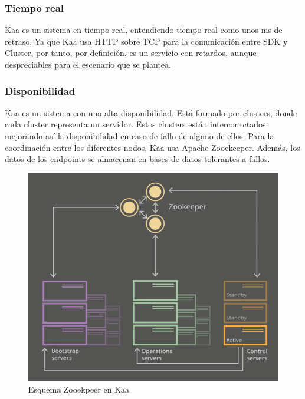 \documentclass[12pt, twoside]{book}
\begin{document}
\subsubsection*{Tiempo real}
Kaa es un sistema en tiempo real, entendiendo tiempo real como unos ms de retraso. Ya que Kaa usa HTTP sobre TCP para la comunicación entre SDK y Cluster, por tanto, por definición, es un servicio con retardos, aunque despreciables para el escenario que se plantea.


\subsubsection*{Disponibilidad}
Kaa es un sistema con una alta disponibilidad. Está formado por clusters, donde cada cluster representa un servidor. Estos clusters están interconectados mejorando así la disponibilidad en caso de fallo de alguno de ellos. Para la coordinación entre los diferentes nodos, Kaa usa Apache Zooekeeper. Además, los datos de los endpoints se almacenan en bases de datos tolerantes a fallos.
\begin{figure}[H]
\centering
\includegraphics[scale=0.5]{images/disponibilidad_captura}
\caption{Esquema Zooekpeer en Kaa}\label{L509}
\end{figure} 
\end{document}
